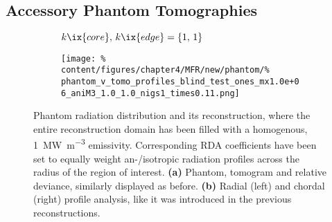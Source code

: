        \subsection{Accessory Phantom Tomographies}\label{apx:accessory}%
%
            \begin{figure}[h]%
                \centering%
                \begin{subfigure}{\textwidth}%
                    \centering%
                    \caption{$k\ix{core},\,k\ix{edge}=\left\{1,\,1\right\}$}%
                \end{subfigure}%
                \newline%
                \begin{subfigure}{\textwidth}%
                    \centering%
                    \texttt{[image: \%
                        content/figures/chapter4/MFR/new/phantom/\%
                        phantom\_v\_tomo\_profiles\_blind\_test\_ones\_mx1.0e+06\_aniM3\_1.0\_1.0\_nigs1\_times0.11.png]}%
                    \caption{}%
                \end{subfigure}%
                \caption{Phantom radiation distribution and its reconstruction, where the entire reconstruction domain has been filled with a homogenous, \SI{1}{\mega\watt\per\cubic\meter} emissivity. Corresponding RDA coefficients have been set to equally weight an-/isotropic radiation profiles across the radius of the region of interest. \textbf{(a)} Phantom, tomogram and relative deviance, similarly displayed as before. \textbf{(b)} Radial (left) and chordal (right) profile analysis, like it was introduced in the previous reconstructions.}\label{fig:phantom_blind_test}%
            \end{figure}%
%
